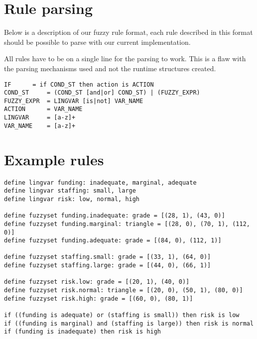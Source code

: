 \appendix

\section{Rule parsing}\label{rule parsing}
Below is a description of our fuzzy rule format, each rule described in this
format should be possible to parse with our current implementation.

All rules have to be on a single line for the parsing to work. This is a flaw
with the parsing mechanisms used and not the runtime structures created.

\lstset{frame=single, breaklines=true}
\begin{lstlisting}[label=lst: bnf, caption=BNF of our rules]
IF		= if COND_ST then action is ACTION
COND_ST		= (COND_ST [and|or] COND_ST) | (FUZZY_EXPR)
FUZZY_EXPR	= LINGVAR [is|not] VAR_NAME
ACTION		= VAR_NAME
LINGVAR		= [a-z]+
VAR_NAME	= [a-z]+
\end{lstlisting}

\section{Example rules}\label{example rules}

\begin{lstlisting}[label=lst:example rules, caption=Example rules representing
project risks]
define lingvar funding: inadequate, marginal, adequate
define lingvar staffing: small, large
define lingvar risk: low, normal, high

define fuzzyset funding.inadequate: grade = [(28, 1), (43, 0)]
define fuzzyset funding.marginal: triangle = [(28, 0), (70, 1), (112, 0)]
define fuzzyset funding.adequate: grade = [(84, 0), (112, 1)]

define fuzzyset staffing.small: grade = [(33, 1), (64, 0)]
define fuzzyset staffing.large: grade = [(44, 0), (66, 1)]

define fuzzyset risk.low: grade = [(20, 1), (40, 0)]
define fuzzyset risk.normal: triangle = [(20, 0), (50, 1), (80, 0)]
define fuzzyset risk.high: grade = [(60, 0), (80, 1)]

if ((funding is adequate) or (staffing is small)) then risk is low
if ((funding is marginal) and (staffing is large)) then risk is normal
if (funding is inadequate) then risk is high
\end{lstlisting}
